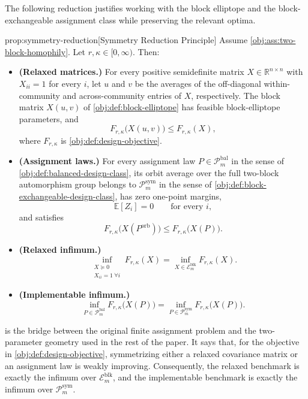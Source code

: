 The following reduction justifies working with the block elliptope and the block-exchangeable assignment class while preserving the relevant optima.

\begin{propositionv}{prop:symmetry-reduction}[Symmetry Reduction Principle]
Assume \cref{obj:ass:two-block-homophily}. Let \(r,\kappa\in[0,\infty)\). Then:
\begin{itemize}
\item \textbf{(Relaxed matrices.)} For every positive semidefinite matrix \(X\in\mathbb R^{n\times n}\) with \(X_{ii}=1\) for every \(i\), let \(u\) and \(v\) be the averages of the off-diagonal within-community and across-community entries of \(X\), respectively. The block matrix \(X(u,v)\) of \cref{obj:def:block-elliptope} has feasible block-elliptope parameters, and
\[
F_{r,\kappa}\bigl(X(u,v)\bigr)\le F_{r,\kappa}(X),
\]
where \(F_{r,\kappa}\) is \cref{obj:def:design-objective}.
\item \textbf{(Assignment laws.)} For every assignment law \(P\in\mathcal P_m^{\mathrm{bal}}\) in the sense of \cref{obj:def:balanced-design-class}, its orbit average over the full two-block automorphism group belongs to \(\mathcal P_m^{\mathrm{sym}}\) in the sense of \cref{obj:def:block-exchangeable-design-class}, has zero one-point margins,
\[
\mathbb E[Z_i]=0\qquad\text{for every }i,
\]
and satisfies
\[
F_{r,\kappa}\bigl(X(P^{\mathrm{orb}})\bigr)\le F_{r,\kappa}\bigl(X(P)\bigr).
\]
\item \textbf{(Relaxed infimum.)}
\[
\inf_{\substack{X\succeq0\\ X_{ii}=1\ \forall i}} F_{r,\kappa}(X)
=
\inf_{X\in\mathcal E_m^{\mathrm{blk}}} F_{r,\kappa}(X).
\]
\item \textbf{(Implementable infimum.)}
\[
\inf_{P\in\mathcal P_m^{\mathrm{bal}}} F_{r,\kappa}\bigl(X(P)\bigr)
=
\inf_{P\in\mathcal P_m^{\mathrm{sym}}} F_{r,\kappa}\bigl(X(P)\bigr).
\]
\end{itemize}
\end{propositionv}

 is the bridge between the original finite assignment problem and the two-parameter geometry used in the rest of the paper. It says that, for the objective in \cref{obj:def:design-objective}, symmetrizing either a relaxed covariance matrix or an assignment law is weakly improving. Consequently, the relaxed benchmark is exactly the infimum over \(\mathcal E_m^{\mathrm{blk}}\), and the implementable benchmark is exactly the infimum over \(\mathcal P_m^{\mathrm{sym}}\).
